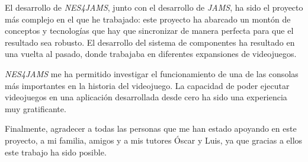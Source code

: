 El desarrollo de \textit{NES4JAMS}, junto con el desarrollo
de \textit{JAMS}, ha sido el proyecto más complejo en el
que he trabajado:
este proyecto ha abarcado un montón de conceptos y tecnologías
que hay que sincronizar de manera perfecta para que el resultado
sea robusto.
El desarrollo del sistema de componentes ha resultado en una
vuelta al pasado, donde trabajaba en diferentes expansiones
de videojuegos.

\textit{NES4JAMS} me ha permitido investigar el funcionamiento
de una de las consolas más importantes en la
historia del videojuego.
La capacidad de poder ejecutar videojuegos en una aplicación
desarrollada desde cero ha sido una experiencia muy gratificante.

Finalmente, agradecer a todas las personas que me han
estado apoyando en este proyecto, a mi familia, amigos y a mis
tutores Óscar y Luis, ya que gracias a ellos este trabajo
ha sido posible.
